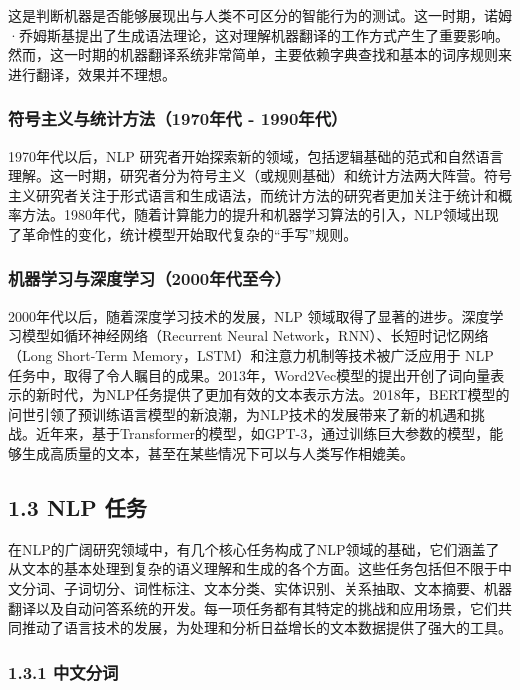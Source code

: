 \documentclass[12pt,a4paper]{book}
\begin{document}
这是判断机器是否能够展现出与人类不可区分的智能行为的测试。这一时期，诺姆·乔姆斯基提出了生成语法理论，这对理解机器翻译的工作方式产生了重要影响。然而，这一时期的机器翻译系统非常简单，主要依赖字典查找和基本的词序规则来进行翻译，效果并不理想。

\subsubsection{符号主义与统计方法（1970年代 -
1990年代）}\label{ux7b26ux53f7ux4e3bux4e49ux4e0eux7edfux8ba1ux65b9ux6cd51970ux5e74ux4ee3---1990ux5e74ux4ee3}

1970年代以后，NLP
研究者开始探索新的领域，包括逻辑基础的范式和自然语言理解。这一时期，研究者分为符号主义（或规则基础）和统计方法两大阵营。符号主义研究者关注于形式语言和生成语法，而统计方法的研究者更加关注于统计和概率方法。1980年代，随着计算能力的提升和机器学习算法的引入，NLP领域出现了革命性的变化，统计模型开始取代复杂的``手写''规则。

\subsubsection{机器学习与深度学习（2000年代至今）}\label{ux673aux5668ux5b66ux4e60ux4e0eux6df1ux5ea6ux5b66ux4e602000ux5e74ux4ee3ux81f3ux4eca}

2000年代以后，随着深度学习技术的发展，NLP
领域取得了显著的进步。深度学习模型如循环神经网络（Recurrent Neural
Network，RNN）、长短时记忆网络（Long Short-Term
Memory，LSTM）和注意力机制等技术被广泛应用于 NLP
任务中，取得了令人瞩目的成果。2013年，Word2Vec模型的提出开创了词向量表示的新时代，为NLP任务提供了更加有效的文本表示方法。2018年，BERT模型的问世引领了预训练语言模型的新浪潮，为NLP技术的发展带来了新的机遇和挑战。近年来，基于Transformer的模型，如GPT-3，通过训练巨大参数的模型，能够生成高质量的文本，甚至在某些情况下可以与人类写作相媲美。

\subsection{1.3 NLP 任务}\label{nlp-ux4efbux52a1}

在NLP的广阔研究领域中，有几个核心任务构成了NLP领域的基础，它们涵盖了从文本的基本处理到复杂的语义理解和生成的各个方面。这些任务包括但不限于中文分词、子词切分、词性标注、文本分类、实体识别、关系抽取、文本摘要、机器翻译以及自动问答系统的开发。每一项任务都有其特定的挑战和应用场景，它们共同推动了语言技术的发展，为处理和分析日益增长的文本数据提供了强大的工具。

\subsubsection{1.3.1 中文分词}\label{ux4e2dux6587ux5206ux8bcd}
\end{document}
